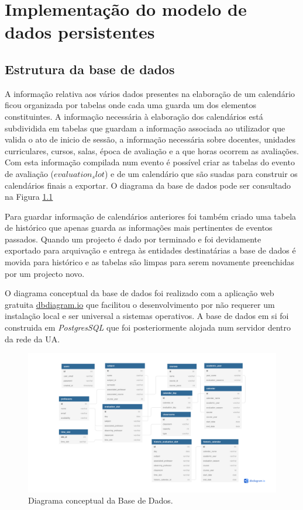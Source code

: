 \documentclass[11pt, twoside]{report}
\begin{document}
	\chapter{Implementação do modelo de dados persistentes}
	\section{Estrutura da base de dados}
	A informação relativa aos vários dados presentes na elaboração de um calendário ficou organizada por tabelas onde cada uma guarda um dos elementos constituintes.
	A informação necessária à elaboração dos calendários está subdividida em tabelas que guardam a informação associada ao utilizador que valida o ato de inicio de sessão, a informação necessária sobre docentes, unidades curriculares, cursos, salas, época de avaliação e a que horas ocorrem as avaliações.
	Com esta informação compilada num evento é possível criar as tabelas do evento de avaliação (\textit{$ evaluation_slot $}) e de um calendário que são suadas para construir os calendários finais a exportar.
	O diagrama da base de dados pode ser consultado na Figura \ref{fig:calendariodb}
	
	Para guardar informação de calendários anteriores foi também criado uma tabela de histórico que apenas guarda as informações mais pertinentes de eventos passados.
	Quando um projecto é dado por terminado e foi devidamente exportado para arquivação e entrega às entidades destinatárias a base de dados é movida para histórico e as tabelas são limpas para serem novamente preenchidas por um projecto novo.
	
	O diagrama conceptual da base de dados foi realizado com a aplicação web gratuita \href{https://dbdiagram.io/}{dbdiagram.io} que facilitou o desenvolvimento por não requerer um instalação local e ser universal a sistemas operativos.
	A base de dados em si foi construida em \textit{PostgresSQL} que foi posteriormente alojada num servidor dentro da rede da UA.
	
	\begin{figure}[H]
		\centering
		\includegraphics[width=0.95\linewidth]{image/Calendario_DB}
		\caption{Diagrama conceptual da Base de Dados.}
		\label{fig:calendariodb}
	\end{figure}
	
\end{document}
